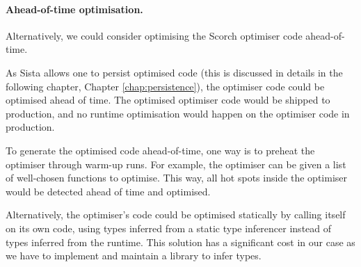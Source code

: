 \documentclass[a4paper,12pt,twoside]{../includes/ThesisStyle}
\begin{document}
\paragraph{Ahead-of-time optimisation.} 
Alternatively, we could consider optimising the Scorch optimiser code ahead-of-time.

As Sista allows one to persist optimised code (this is discussed in details in the following chapter, Chapter \ref{chap:persistence}), the optimiser code could be optimised ahead of time. The optimised optimiser code would be shipped to production, and no runtime optimisation would happen on the optimiser code in production.

To generate the optimised code ahead-of-time, one way is to preheat the optimiser through warm-up runs. For example, the optimiser can be given a list of well-chosen functions to optimise. This way, all hot spots inside the optimiser would be detected ahead of time and optimised. 

Alternatively, the optimiser's code could be optimised statically by calling itself on its own code, using types inferred from a static type inferencer instead of types inferred from the runtime. This solution has a significant cost in our case as we have to implement and maintain a library to infer types.




\end{document}
